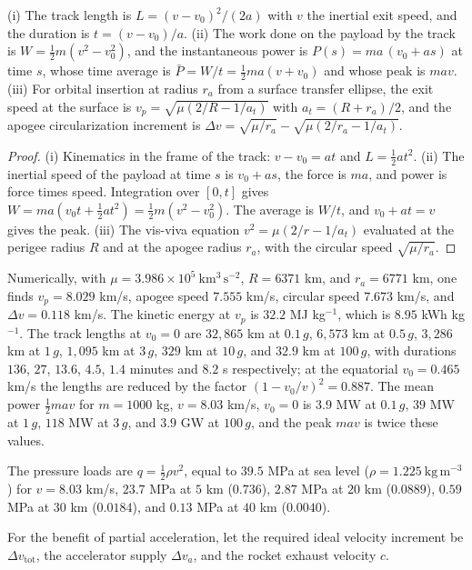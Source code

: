 \begin{proposition}
(i) The track length is $L=(v-v_0)^2/(2a)$ with $v$ the inertial exit speed, and the duration is $t=(v-v_0)/a$. (ii) The work done on the payload by the track is $W=\tfrac12m(v^2-v_0^2)$, and the instantaneous power is $P(s)=ma\,(v_0+as)$ at time $s$, whose time average is $\bar P=W/t=\tfrac12 m a (v+v_0)$ and whose peak is $mav$. (iii) For orbital insertion at radius $r_a$ from a surface transfer ellipse, the exit speed at the surface is $v_p=\sqrt{\mu(2/R-1/a_t)}$ with $a_t=(R+r_a)/2$, and the apogee circularization increment is $\Delta v=\sqrt{\mu/r_a}-\sqrt{\mu(2/r_a-1/a_t)}$.
\end{proposition}

\begin{proof}
(i) Kinematics in the frame of the track: $v-v_0=at$ and $L=\tfrac12 a t^2$. (ii) The inertial speed of the payload at time $s$ is $v_0+as$, the force is $ma$, and power is force times speed. Integration over $[0,t]$ gives $W=ma(v_0t+\tfrac12at^2)=\tfrac12m(v^2-v_0^2)$. The average is $W/t$, and $v_0+at=v$ gives the peak. (iii) The vis-viva equation $v^2=\mu(2/r-1/a_t)$ evaluated at the perigee radius $R$ and at the apogee radius $r_a$, with the circular speed $\sqrt{\mu/r_a}$.
\end{proof}

Numerically, with $\mu=3.986\times10^5\ \mathrm{km^3\,s^{-2}}$, $R=6371$ km, and $r_a=6771$ km, one finds $v_p=8.029$ km/s, apogee speed $7.555$ km/s, circular speed $7.673$ km/s, and $\Delta v=0.118$ km/s. The kinetic energy at $v_p$ is $32.2$ MJ kg$^{-1}$, which is $8.95$ kWh kg$^{-1}$. The track lengths at $v_0=0$ are $32{,}865$ km at $0.1\,g$, $6{,}573$ km at $0.5\,g$, $3{,}286$ km at $1\,g$, $1{,}095$ km at $3\,g$, $329$ km at $10\,g$, and $32.9$ km at $100\,g$, with durations $136$, $27$, $13.6$, $4.5$, $1.4$ minutes and $8.2$ s respectively; at the equatorial $v_0=0.465$ km/s the lengths are reduced by the factor $(1-v_0/v)^2=0.887$. The mean power $\tfrac12mav$ for $m=1000$ kg, $v=8.03$ km/s, $v_0=0$ is $3.9$ MW at $0.1\,g$, $39$ MW at $1\,g$, $118$ MW at $3\,g$, and $3.9$ GW at $100\,g$, and the peak $mav$ is twice these values.

The pressure loads are $q=\tfrac12\rho v^2$, equal to $39.5$ MPa at sea level ($\rho=1.225\ \mathrm{kg\,m^{-3}}$) for $v=8.03$ km/s, $23.7$ MPa at $5$ km ($0.736$), $2.87$ MPa at $20$ km ($0.0889$), $0.59$ MPa at $30$ km ($0.0184$), and $0.13$ MPa at $40$ km ($0.0040$).

For the benefit of partial acceleration, let the required ideal velocity increment be $\Delta v_{\mathrm{tot}}$, the accelerator supply $\Delta v_a$, and the rocket exhaust velocity $c$.

